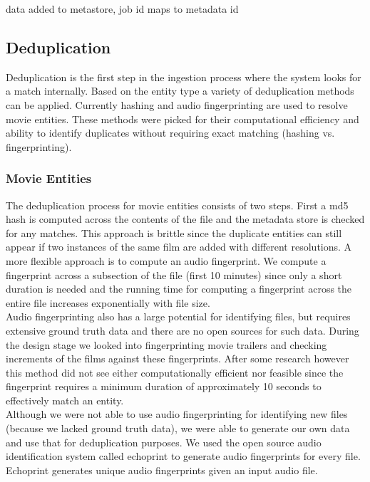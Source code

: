 \documentclass[paper=a4, fontsize=11pt]{scrartcl} %
\numberwithin{equation}{section} %
\numberwithin{figure}{section} %
\numberwithin{table}{section} %
\begin{document}
data added to metastore, job id maps to metadata id


\subsection{Deduplication}
\label{sec:deduplication}
Deduplication is the first step in the ingestion process where the system looks for a match internally. Based on the entity type a variety of deduplication methods can be applied. Currently hashing and audio fingerprinting are used to resolve movie entities. These methods were picked for their computational efficiency and ability to identify duplicates without requiring exact matching (hashing vs. fingerprinting). \\

\subsubsection{Movie Entities}
\label{sec:dedup-movie-entities}
The deduplication process for movie entities consists of two steps. First a md5 hash is computed across the contents of the file and the metadata store is checked for any matches. This approach is brittle since the duplicate entities can still appear if two instances of the same film are added with different resolutions. A more flexible approach is to compute an audio fingerprint. We compute a fingerprint across a subsection of the file (first 10 minutes) since only a short duration is needed and the running time for computing a fingerprint across the entire file increases exponentially with file size. \\

Audio fingerprinting also has a large potential for identifying files, but requires extensive ground truth data and there are no open sources for such data. During the design stage we looked into fingerprinting movie trailers and checking increments of the films against these fingerprints. After some research however this method did not see either computationally efficient nor feasible since the fingerprint requires a minimum duration of approximately 10 seconds to effectively match an entity. \\


Although we were not able to use audio fingerprinting for identifying new files (because we lacked ground truth data), we were able to generate our own data and use that for deduplication purposes. We used the open source audio identification system called echoprint to generate audio fingerprints for every file. Echoprint generates unique audio fingerprints given an input audio file.  \\
\end{document}
